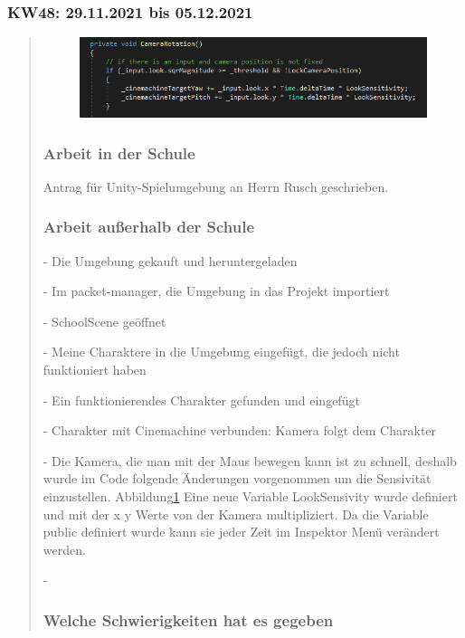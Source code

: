 

\subsubsection{KW48: 29.11.2021 bis 05.12.2021}
\begin{quote}
	\begin{figure}
		\centering
		\includegraphics[width=0.7\linewidth]{img/SemihSoenmez_IMG/screenshot001}
		\caption{}
		\label{CodeKamera}
	\end{figure}
	
	\subsubsection*{Arbeit in der Schule}
	Antrag für Unity-Spielumgebung an Herrn Rusch geschrieben.

	\subsubsection*{Arbeit außerhalb der Schule}
	- Die Umgebung gekauft und heruntergeladen
	
	- Im packet-manager, die Umgebung in das Projekt importiert
	
	- SchoolScene geöffnet
	
	- Meine Charaktere in die Umgebung eingefügt, die jedoch nicht funktioniert haben
	
	- Ein funktionierendes Charakter gefunden und eingefügt
	
	- Charakter mit Cinemachine verbunden: Kamera folgt dem Charakter
	
	- Die Kamera, die man mit der Maus bewegen kann ist zu schnell, deshalb wurde im Code folgende Änderungen vorgenommen um die Sensivität einzustellen. Abbildung\ref{CodeKamera}
	Eine neue Variable LookSensivity wurde definiert und mit der x y Werte von der Kamera multipliziert. Da die Variable public definiert wurde kann sie jeder Zeit im Inspektor Menü verändert werden.
	
	-
	
		
	
	\subsubsection*{Welche Schwierigkeiten hat es gegeben}
	
\end{quote}

